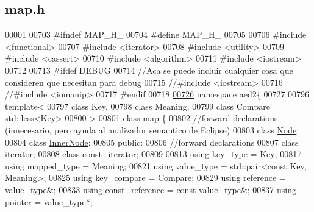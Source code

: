 \hypertarget{map_8h_source}{\subsection{map.\-h}
}

\begin{DoxyCode}
00001 
00703 \textcolor{preprocessor}{#ifndef MAP\_H\_}
00704 \textcolor{preprocessor}{}\textcolor{preprocessor}{#define MAP\_H\_}
00705 \textcolor{preprocessor}{}
00706 \textcolor{preprocessor}{#include <functional>}
00707 \textcolor{preprocessor}{#include <iterator>}
00708 \textcolor{preprocessor}{#include <utility>}
00709 \textcolor{preprocessor}{#include <cassert>}
00710 \textcolor{preprocessor}{#include <algorithm>}
00711 \textcolor{preprocessor}{#include <iostream>}
00712 
00713 \textcolor{preprocessor}{#ifdef DEBUG}
00714 \textcolor{preprocessor}{}\textcolor{comment}{//Aca se puede incluir cualquier cosa que consideren que necesitan para debug}
00715 \textcolor{comment}{//#include <iostream>}
00716 \textcolor{comment}{//#include <iomanip>}
00717 \textcolor{preprocessor}{#endif}
00718 \textcolor{preprocessor}{}
\hypertarget{map_8h_source_l00726}{}\hyperlink{namespaceaed2}{00726} \textcolor{keyword}{namespace }aed2\{
00727 
00796 \textcolor{keyword}{template}<
00797   \textcolor{keyword}{class }Key,
00798   \textcolor{keyword}{class }Meaning,
00799   \textcolor{keyword}{class }Compare = std::less<Key>
00800 >
\hypertarget{map_8h_source_l00801}{}\hyperlink{classaed2_1_1map}{00801} \textcolor{keyword}{class }\hyperlink{classaed2_1_1map}{map} \{
00802     \textcolor{comment}{//forward declarations (innecesario, pero ayuda al analizador semantico de
       Eclipse)}
00803     \textcolor{keyword}{class }\hyperlink{structaed2_1_1map_1_1Node}{Node};
00804     \textcolor{keyword}{class }\hyperlink{structaed2_1_1map_1_1InnerNode}{InnerNode};
00805 \textcolor{keyword}{public}:
00806     \textcolor{comment}{//forward declarations}
00807     \textcolor{keyword}{class }\hyperlink{classaed2_1_1map_1_1iterator}{iterator};
00808     \textcolor{keyword}{class }\hyperlink{classaed2_1_1map_1_1const__iterator}{const_iterator};
00809 
00813     \textcolor{keyword}{using} key\_type = Key;
00817     \textcolor{keyword}{using} mapped\_type = Meaning;
00821     \textcolor{keyword}{using} value\_type = std::pair<const Key, Meaning>;
00825     \textcolor{keyword}{using} key\_compare = Compare;
00829     \textcolor{keyword}{using} reference = value\_type&;
00833     \textcolor{keyword}{using} const\_reference = \textcolor{keyword}{const} value\_type&;
00837     \textcolor{keyword}{using} pointer = value\_type*;

\end{DoxyCode}
